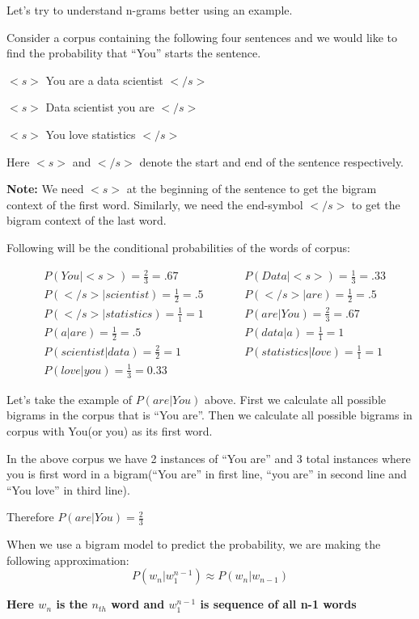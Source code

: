 \documentclass[11pt]{article}
\begin{document}
Let's try to understand n-grams better using an example.

Consider a corpus containing the following four sentences and we would
like to find the probability that ``You'' starts the sentence.

\(<s>\) You are a data scientist \(</s>\)

\(<s>\) Data scientist you are \(</s>\)

\(<s>\) You love statistics \(</s>\)

Here \(<s>\) and \(</s>\) denote the start and end of the sentence
respectively.

\textbf{Note:} We need \(<s>\) at the beginning of the sentence to get
the bigram context of the first word. Similarly, we need the end-symbol
\(</s>\) to get the bigram context of the last word.

Following will be the conditional probabilities of the words of corpus:

\begin{align}
& P(You|<s>) = \frac{2}{3} = .67  & \qquad &  P(Data|<s>) = \frac{1}{3} = .33  \\
& P(</s>|scientist) = \frac{1}{2} = .5  & \qquad &  P(</s>|are) = \frac{1}{2} = .5  \\
& P(</s>|statistics) = \frac{1}{1} = 1  & \qquad &  P(are|You) = \frac{2}{3} = .67  \\
& P(a|are) = \frac{1}{2} = .5  & \qquad &  P(data|a) = \frac{1}{1} = 1  \\
& P(scientist|data) = \frac{2}{2} = 1  & \qquad &  P(statistics|love) = \frac{1}{1}=1  \\
& P(love|you) = \frac{1}{3} = 0.33
\end{align}

Let's take the example of \(P(are|You)\) above. First we calculate all
possible bigrams in the corpus that is ``You are''. Then we calculate
all possible bigrams in corpus with You(or you) as its first word.

In the above corpus we have 2 instances of ``You are'' and 3 total
instances where you is first word in a bigram(``You are'' in first line,
``you are'' in second line and ``You love'' in third line).

Therefore \(P(are|You)=\frac{2}{3}\)

When we use a bigram model to predict the probability, we are making the
following approximation:
\[ P(w_n |w^{n−1}_1 ) \approx P(w_n |w_{n−1} ) \]

\textbf{Here \(w_n\) is the \(n_{th}\) word and \(w^{n−1}_1\) is
sequence of all n-1 words}
\end{document}
